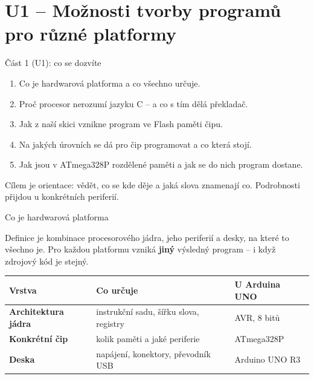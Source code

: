 \documentclass[12pt,aspectratio=169]{beamer}
\begin{document}
\section{U1 -- Možnosti tvorby programů pro různé platformy}

\begin{keyframe}{Část 1 (U1): co se dozvíte}
  \small
  \begin{enumerate}\itemsep2pt
    \item Co je hardwarová platforma a co všechno určuje.
    \item Proč procesor nerozumí jazyku C -- a co s tím dělá překladač.
    \item Jak z naší skici vznikne program ve Flash paměti čipu.
    \item Na jakých úrovních se dá pro čip programovat a co která stojí.
    \item Jak jsou v ATmega328P rozdělené paměti a jak se do nich program dostane.
  \end{enumerate}
  \vfill
   Cílem je orientace: vědět, co se kde děje a jaká slova
  znamenají co. Podrobnosti přijdou u konkrétních periferií.
\end{keyframe}

\begin{frame}{Co je hardwarová platforma}
  \begin{block}{Definice}
     je kombinace procesorového jádra, jeho periferií
    a desky, na které to všechno je. Pro každou platformu vzniká \textbf{jiný}
    výsledný program -- i když zdrojový kód je stejný.
  \end{block}
  \vspace{2mm}
  \small
  \begin{tabular}{@{}p{3.1cm}p{3.2cm}p{4.2cm}@{}}
    \toprule
    Vrstva & Co určuje & U Arduina UNO \\
    \midrule
    \textbf{Architektura jádra} & instrukční sadu, šířku slova, registry
      & AVR, 8 bitů \\
    \textbf{Konkrétní čip} & kolik paměti a jaké periferie
      & ATmega328P \\
    \textbf{Deska} & napájení, konektory, převodník USB
      & Arduino UNO R3 \\
    \bottomrule
  \end{tabular}
\end{frame}
\end{document}
